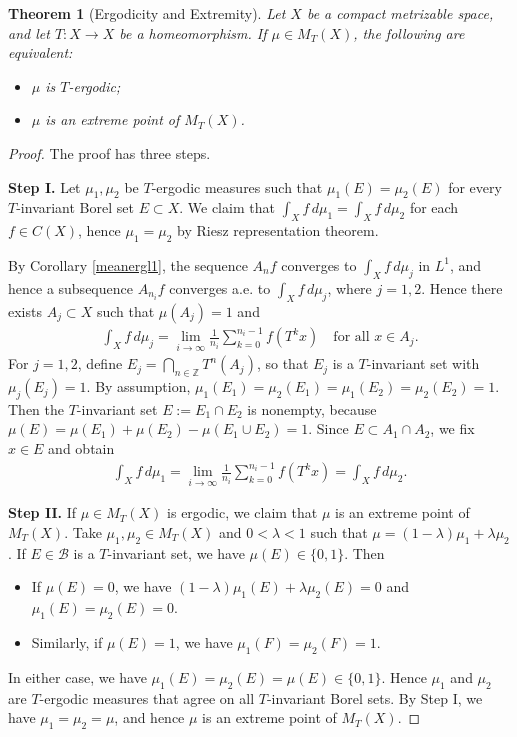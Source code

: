 \documentclass{article}
\numberwithin{equation}{section}
\newcommand{\bbZ}{\mathbb{Z}}
\newcommand{\scr}{\mathscr}
\theoremstyle{plain}
\newtheorem{theorem}{Theorem}[section]
\theoremstyle{definition}
\begin{document}
\begin{theorem}[Ergodicity and Extremity]\label{ergext}
Let $X$ be a compact metrizable space, and let $T:X\to X$ be a homeomorphism. If $\mu\in M_T(X)$, the following are equivalent:
\begin{itemize}
	\item[(i)] $\mu$ is $T$-ergodic;
	\item[(ii)] $\mu$ is an extreme point of $M_T(X)$.
\end{itemize}
\end{theorem}
\begin{proof}
The proof has three steps.
\item\textbf{Step I.} Let $\mu_1,\mu_2$ be $T$-ergodic measures such that $\mu_1(E)=\mu_2(E)$ for every $T$-invariant Borel set $E\subset X$. We claim that $\int_X f\,d\mu_1=\int_X f\,d\mu_2$ for each $f\in C(X)$, hence $\mu_1=\mu_2$ by Riesz representation theorem.

By Corollary \ref{meanergl1}, the sequence $A_n f$ converges to $\int_X f\,d\mu_j$ in $L^1$, and hence a subsequence $A_{n_i}f$ converges a.e. to $\int_X f\,d\mu_j$, where $j=1,2$. Hence there exists $A_j\subset X$ such that $\mu(A_j)=1$ and
\begin{align*}
	\int_X f\,d\mu_j=\lim_{i\to\infty}\frac{1}{n_i}\sum_{k=0}^{n_i-1}f(T^kx)\quad\text{for all $x\in A_j$}.
\end{align*}
For $j=1,2$, define $E_j=\bigcap_{n\in\bbZ}T^n(A_j)$, so that $E_j$ is a $T$-invariant set with $\mu_j(E_j)=1$. By assumption, $\mu_1(E_1)=\mu_2(E_1)=\mu_1(E_2)=\mu_2(E_2)=1$. Then the $T$-invariant set $E:=E_1\cap E_2$ is nonempty, because $\mu(E)=\mu(E_1)+\mu(E_2)-\mu(E_1\cup E_2)=1$. Since $E\subset A_1\cap A_2$, we fix $x\in E$ and obtain
\begin{align*}
	\int_X f\,d\mu_1=\lim_{i\to\infty}\frac{1}{n_i}\sum_{k=0}^{n_i-1}f(T^kx)=\int_X f\,d\mu_2.
\end{align*}
\item\textbf{Step II.} If $\mu\in M_T(X)$ is ergodic, we claim that $\mu$ is an extreme point of $M_T(X)$. Take $\mu_1,\mu_2\in M_T(X)$ and $0<\lambda<1$ such that $\mu=(1-\lambda)\mu_1+\lambda\mu_2$. If $E\in\scr{B}$ is a $T$-invariant set, we have $\mu(E)\in\{0,1\}$. Then
\begin{itemize}
	\item If $\mu(E)=0$, we have $(1-\lambda)\mu_1(E)+\lambda\mu_2(E)=0$ and $\mu_1(E)=\mu_2(E)=0$. \item Similarly, if $\mu(E)=1$, we have $\mu_1(F)=\mu_2(F)=1$.
\end{itemize}
In either case, we have $\mu_1(E)=\mu_2(E)=\mu(E)\in\{0,1\}$. Hence $\mu_1$ and $\mu_2$ are $T$-ergodic measures that agree on all $T$-invariant Borel sets. By Step I, we have $\mu_1=\mu_2=\mu$, and hence $\mu$ is an extreme point of $M_T(X)$.


\end{proof}
\end{document}
